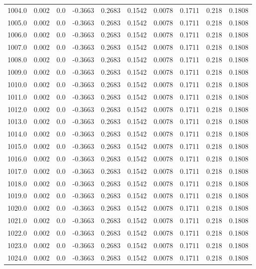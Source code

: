 \begin{longtable}{lrrrrrrrrr}
1004.0 & 0.002 & 0.0 & -0.3663 & 0.2683 & 0.1542 & 0.0078 & 0.1711 & 0.218 & 0.1808 \\
1005.0 & 0.002 & 0.0 & -0.3663 & 0.2683 & 0.1542 & 0.0078 & 0.1711 & 0.218 & 0.1808 \\
1006.0 & 0.002 & 0.0 & -0.3663 & 0.2683 & 0.1542 & 0.0078 & 0.1711 & 0.218 & 0.1808 \\
1007.0 & 0.002 & 0.0 & -0.3663 & 0.2683 & 0.1542 & 0.0078 & 0.1711 & 0.218 & 0.1808 \\
1008.0 & 0.002 & 0.0 & -0.3663 & 0.2683 & 0.1542 & 0.0078 & 0.1711 & 0.218 & 0.1808 \\
1009.0 & 0.002 & 0.0 & -0.3663 & 0.2683 & 0.1542 & 0.0078 & 0.1711 & 0.218 & 0.1808 \\
1010.0 & 0.002 & 0.0 & -0.3663 & 0.2683 & 0.1542 & 0.0078 & 0.1711 & 0.218 & 0.1808 \\
1011.0 & 0.002 & 0.0 & -0.3663 & 0.2683 & 0.1542 & 0.0078 & 0.1711 & 0.218 & 0.1808 \\
1012.0 & 0.002 & 0.0 & -0.3663 & 0.2683 & 0.1542 & 0.0078 & 0.1711 & 0.218 & 0.1808 \\
1013.0 & 0.002 & 0.0 & -0.3663 & 0.2683 & 0.1542 & 0.0078 & 0.1711 & 0.218 & 0.1808 \\
1014.0 & 0.002 & 0.0 & -0.3663 & 0.2683 & 0.1542 & 0.0078 & 0.1711 & 0.218 & 0.1808 \\
1015.0 & 0.002 & 0.0 & -0.3663 & 0.2683 & 0.1542 & 0.0078 & 0.1711 & 0.218 & 0.1808 \\
1016.0 & 0.002 & 0.0 & -0.3663 & 0.2683 & 0.1542 & 0.0078 & 0.1711 & 0.218 & 0.1808 \\
1017.0 & 0.002 & 0.0 & -0.3663 & 0.2683 & 0.1542 & 0.0078 & 0.1711 & 0.218 & 0.1808 \\
1018.0 & 0.002 & 0.0 & -0.3663 & 0.2683 & 0.1542 & 0.0078 & 0.1711 & 0.218 & 0.1808 \\
1019.0 & 0.002 & 0.0 & -0.3663 & 0.2683 & 0.1542 & 0.0078 & 0.1711 & 0.218 & 0.1808 \\
1020.0 & 0.002 & 0.0 & -0.3663 & 0.2683 & 0.1542 & 0.0078 & 0.1711 & 0.218 & 0.1808 \\
1021.0 & 0.002 & 0.0 & -0.3663 & 0.2683 & 0.1542 & 0.0078 & 0.1711 & 0.218 & 0.1808 \\
1022.0 & 0.002 & 0.0 & -0.3663 & 0.2683 & 0.1542 & 0.0078 & 0.1711 & 0.218 & 0.1808 \\
1023.0 & 0.002 & 0.0 & -0.3663 & 0.2683 & 0.1542 & 0.0078 & 0.1711 & 0.218 & 0.1808 \\
1024.0 & 0.002 & 0.0 & -0.3663 & 0.2683 & 0.1542 & 0.0078 & 0.1711 & 0.218 & 0.1808 \\

\end{longtable}

